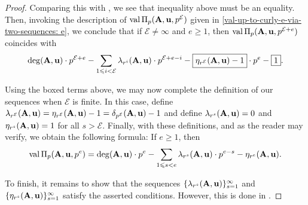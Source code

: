 \documentclass{amsart}
\begin{document}
\begin{proof}
   Comparing this with , we see that inequality above must be an equality.  Then, invoking the description of $\operatorname{val} \Pi_p(\mathbf{A}, \mathbf{u}, p^{\mathcal{E}})$ given in \eqref{val-up-to-curly-e-via-two-sequences: e}, we conclude that if $\mathcal{E} \neq \infty$ and $e \geq 1$, then  $\operatorname{val} \Pi_p(\mathbf{A}, \mathbf{u}, p^{\mathcal{E}+e})$ coincides with
   \[
   \deg(\mathbf{A}, \mathbf{u}) \cdot p^{\mathcal{E}+e} - \sum_{1 \leqslant i < \mathcal{E}} \lambda_{r^i}(\mathbf{A}, \mathbf{u}) \cdot p^{\mathcal{E} + e -i} - \boxed{{\eta_{r^{\mathcal{E}}}(\mathbf{A}, \mathbf{u})}-1} \cdot p^e  - \boxed{1}.  
	\]

Using the boxed terms above, we may now complete the definition of our sequences when $\mathcal{E}$ is finite.  In this case, define $\lambda_{r^{\mathcal{E}}}(\mathbf{A}, \mathbf{u}) =  {\eta_{r^{\mathcal{E}}}(\mathbf{A}, \mathbf{u})}-1 = {\delta_{p^{\mathcal{E}}}(\mathbf{A}, \mathbf{u})}-1$ and define $\lambda_{r^s}(\mathbf{A}, \mathbf{u})= 0$ and $\eta_{r^s}(\mathbf{A}, \mathbf{u}) = 1$ for all $s > \mathcal{E}$.  Finally, with these definitions, and as the reader may verify, we obtain the following formula:  If $e \geq 1$, then
\[
\operatorname{val} \Pi_p(\mathbf{A},\mathbf{u}, p^e) =  \deg(\mathbf{A},\mathbf{u}) \cdot p^e - \sum_{1 \leqslant s < e} \lambda_{r^s}(\mathbf{A}, \mathbf{u}) \cdot  p^{e-s} - \eta_{r^e}(\mathbf{A},\mathbf{u}).
\]

To finish, it remains to show that the sequences 
$\{ \lambda_{r^s}(\mathbf{A}, \mathbf{u}) \}_{s=1}^{\infty}$ and $\{ \eta_{r^s}(\mathbf{A}, \mathbf{u}) \}_{s=1}^{\infty}$ satisfy the asserted conditions.  However, this is done in .
\end{proof}
 
\end{document}

